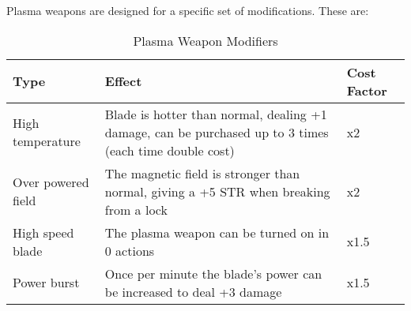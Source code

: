 Plasma weapons are designed for a specific set of modifications. These
are:

\begin{table}[htb]
\begin{center}
\begin{tabular}{lp{2.5in}l}
  \textbf{Type} & \textbf{Effect} & \textbf{Cost Factor} \\
  \hline
  \hline
  High temperature &
  Blade is hotter than normal, dealing +1 damage, can be purchased up to 3 times (each time double cost) &
  x2 \\
  Over powered field
  & The magnetic field is stronger than normal, giving a +5 STR when breaking from a lock &
  x2 \\
  High speed blade &
  The plasma weapon can be turned on in 0 actions &
  x1.5 \\
  Power burst & Once per minute the blade's power can be increased to deal +3 damage &
  x1.5\\
\end{tabular}
\caption{Plasma Weapon Modifiers}
\end{center}
\end{table}

